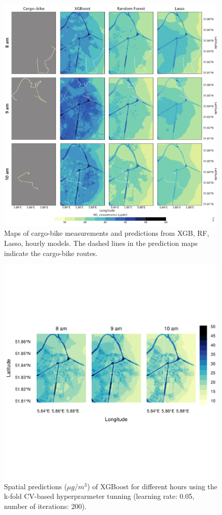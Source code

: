 \documentclass{article}
\begin{document}
\begin{figure}[H]
    \includegraphics[width=\linewidth]{maps.pdf}
    
    \caption {Maps of cargo-bike measurements and predictions from XGB,  RF,  Lasso, hourly models. The dashed lines in the prediction maps indicate the cargo-bike routes.}
    \label{maps}
\end{figure}

\begin{figure}[H]
    \includegraphics[width=\linewidth, trim=1cm 4cm 0cm 1cm, clip=true]{xgbhs.pdf}
    
    \caption {Spatial predictions ($\mu g/m^3$) of XGBoost for different hours using the k-fold CV-based hyperprarmeter tunning (learning rate: 0.05, number of iterations: 200).  }
    \label{xgbls}
\end{figure}
\end{document}
